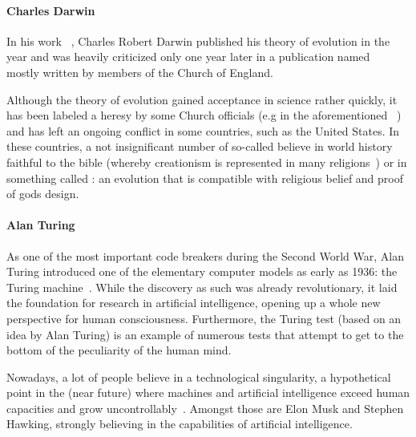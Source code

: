 \paragraph{Charles Darwin} In his work ~\cite{darwin1859origin}, Charles Robert Darwin published
 his theory of evolution in the year \citeyear{darwin1859origin} and was heavily criticized only one year later in a publication named ~\cite{temple1860essays} mostly written by members of the Church of England.

 Although the theory of evolution gained acceptance in science rather quickly, it has been labeled a heresy by some Church officials (e.g in the aforementioned ~\cite{temple1860essays}) and has left an ongoing conflict in some countries, such as the United States.
 In these countries, a not insignificant number of so-called  believe in world history faithful to the bible (whereby creationism is represented in many religions~\cite{Hameed1637}) or in something called : an evolution that is compatible with religious belief and proof of gods design.

\paragraph{Alan Turing} As one of the most important code breakers during the Second World War, Alan Turing introduced one of the elementary computer models as early as 1936: the Turing machine~\cite{turing1936turing}.
While the discovery as such was already revolutionary, it laid the foundation for research in artificial intelligence, opening up a whole new perspective for human consciousness.
Furthermore, the Turing test (based on an idea by Alan Turing) is an example of numerous tests that attempt to get to the bottom of the peculiarity of the human mind.

Nowadays, a lot of people believe in a technological singularity, a hypothetical point in the (near future) where machines and artificial intelligence exceed human capacities and grow uncontrollably~\cite{Eden2013}.
Amongst those are Elon Musk and Stephen Hawking, strongly believing in the capabilities of artificial intelligence.


